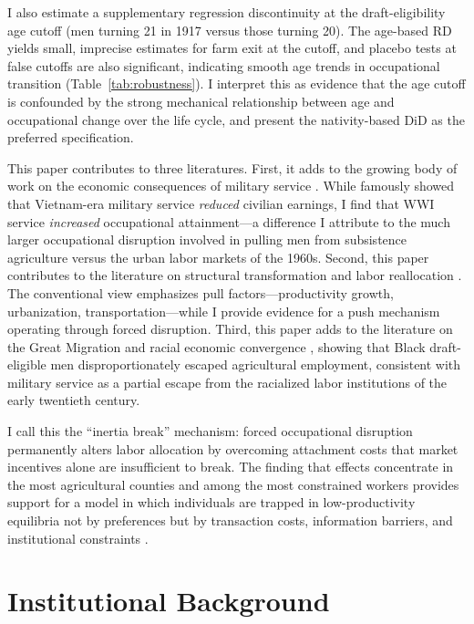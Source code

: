 \documentclass[12pt]{article}
\begin{document}
I also estimate a supplementary regression discontinuity at the draft-eligibility age cutoff (men turning 21 in 1917 versus those turning 20). The age-based RD yields small, imprecise estimates for farm exit at the cutoff, and placebo tests at false cutoffs are also significant, indicating smooth age trends in occupational transition (Table~\ref{tab:robustness}). I interpret this as evidence that the age cutoff is confounded by the strong mechanical relationship between age and occupational change over the life cycle, and present the nativity-based DiD as the preferred specification.

This paper contributes to three literatures. First, it adds to the growing body of work on the economic consequences of military service \citep{angrist1990, angrist1994, bound2002, eriksson2019}. While \citet{angrist1990} famously showed that Vietnam-era military service \textit{reduced} civilian earnings, I find that WWI service \textit{increased} occupational attainment---a difference I attribute to the much larger occupational disruption involved in pulling men from subsistence agriculture versus the urban labor markets of the 1960s. Second, this paper contributes to the literature on structural transformation and labor reallocation \citep{caselli2001, herrendorf2014, hornbeck2012}. The conventional view emphasizes pull factors---productivity growth, urbanization, transportation---while I provide evidence for a push mechanism operating through forced disruption. Third, this paper adds to the literature on the Great Migration and racial economic convergence \citep{collins2014, collins2020}, showing that Black draft-eligible men disproportionately escaped agricultural employment, consistent with military service as a partial escape from the racialized labor institutions of the early twentieth century.

I call this the ``inertia break'' mechanism: forced occupational disruption permanently alters labor allocation by overcoming attachment costs that market incentives alone are insufficient to break. The finding that effects concentrate in the most agricultural counties and among the most constrained workers provides support for a model in which individuals are trapped in low-productivity equilibria not by preferences but by transaction costs, information barriers, and institutional constraints \citep{bryan2014, lagakos2018}.

\section{Institutional Background}
\end{document}
